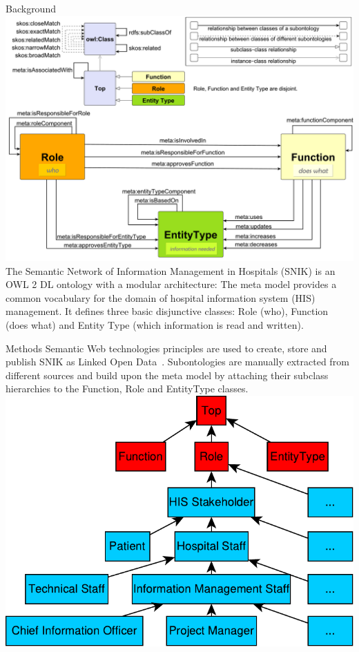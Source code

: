 \documentclass[portrait,final,a0paper,fontscale=0.310]{baposter}
\begin{document}
\begin{poster}
\begin{posterbox}[name=background,column=0,row=0]{Background}
\includegraphics[width=1.01\columnwidth]{img/metamodel9s.pdf}
The Semantic Network of Information Management in Hospitals (SNIK) is an OWL 2 DL ontology with a modular architecture:
The meta model provides a common vocabulary for the domain of hospital information system (HIS) management.
It defines three basic disjunctive classes: Role (who), Function (does what) and Entity Type (which information is read and written). %
\vspace{0.3em}
\end{posterbox}
\begin{posterbox}[name=methods,below=background]{Methods}
Semantic Web technologies principles are used to create, store and publish SNIK as Linked Open Data~\cite{sniktec}.
Subontologies are manually extracted from different sources and build upon the meta model by attaching their subclass hierarchies to the Function, Role and EntityType classes.
{\centering\includegraphics[width=0.8\columnwidth]{img/hierarchy.pdf}}

\end{posterbox}
\end{poster}
\end{document}
